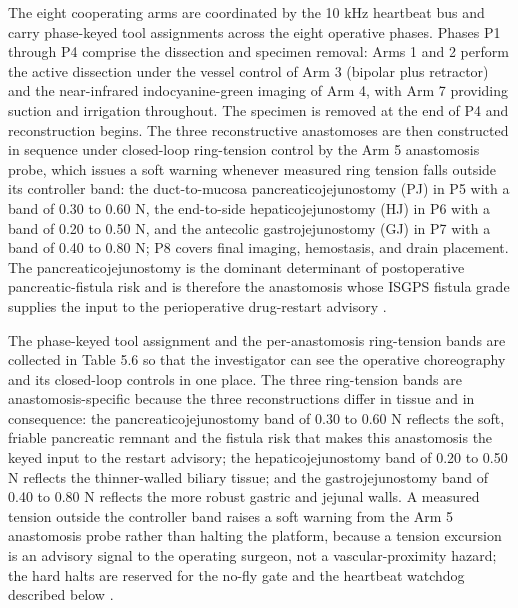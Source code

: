 The eight cooperating arms are coordinated by the 10 kHz heartbeat bus and carry
phase-keyed tool assignments across the eight operative phases. Phases P1 through
P4 comprise the dissection and specimen removal: Arms 1 and 2 perform the active
dissection under the vessel control of Arm 3 (bipolar plus retractor) and the
near-infrared indocyanine-green imaging of Arm 4, with Arm 7 providing suction and
irrigation throughout. The specimen is removed at the end of P4 and reconstruction
begins. The three reconstructive anastomoses are then constructed in sequence under
closed-loop ring-tension control by the Arm 5 anastomosis probe, which issues a
soft warning whenever measured ring tension falls outside its controller band: the
duct-to-mucosa pancreaticojejunostomy (PJ) in P5 with a band of 0.30 to 0.60 N, the
end-to-side hepaticojejunostomy (HJ) in P6 with a band of 0.20 to 0.50 N, and the
antecolic gastrojejunostomy (GJ) in P7 with a band of 0.40 to 0.80 N; P8 covers
final imaging, hemostasis, and drain placement. The pancreaticojejunostomy is the
dominant determinant of postoperative pancreatic-fistula risk and is therefore the
anastomosis whose ISGPS fistula grade supplies the input to the perioperative
drug-restart advisory \cite{daraxwhipple,paisitedocpk}.

The phase-keyed tool assignment and the per-anastomosis ring-tension bands are
collected in Table 5.6 so that the investigator can see the operative choreography
and its closed-loop controls in one place. The three ring-tension bands are
anastomosis-specific because the three reconstructions differ in tissue and in
consequence: the pancreaticojejunostomy band of 0.30 to 0.60 N reflects the soft,
friable pancreatic remnant and the fistula risk that makes this anastomosis the
keyed input to the restart advisory; the hepaticojejunostomy band of 0.20 to 0.50 N
reflects the thinner-walled biliary tissue; and the gastrojejunostomy band of 0.40
to 0.80 N reflects the more robust gastric and jejunal walls. A measured tension
outside the controller band raises a soft warning from the Arm 5 anastomosis probe
rather than halting the platform, because a tension excursion is an advisory signal
to the operating surgeon, not a vascular-proximity hazard; the hard halts are
reserved for the no-fly gate and the heartbeat watchdog described below
\cite{daraxwhipple,onpremwhippl}.

